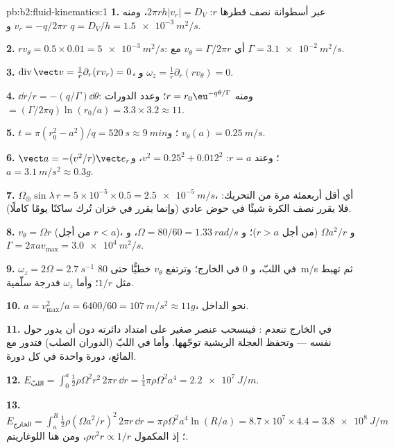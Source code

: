 \begin{solution}{pb:b2:fluid-kinematics:1}
\textbf{1.} عبر أسطوانة نصف قطرها $r$: $2\pi rh|v_r| = D_V$، ومنه
$v_r = -q/2\pi r$ و $q = D_V/h = \qty{1.5e-3}{m^2/s}$.

\textbf{2.} $rv_\theta = 0.5 \times 0.01 = \qty{5e-3}{m^2/s}$: أي $v_\theta = \Gamma/2\pi r$
مع $\Gamma = \qty{3.1e-2}{m^2/s}$.

\textbf{3.} $\operatorname{div}\vect v = \frac1r\partial_r(rv_r) = 0$، و $\omega_z =
\frac1r\partial_r(rv_\theta) = 0$.

\textbf{4.} $\dd r/r = -(q/\Gamma)\dd\theta$: ومنه $r = r_0\eu^{-q\theta/\Gamma}$؛ وعدد الدورات
$= (\Gamma/2\pi q)\ln(r_0/a) = 3.3 \times 3.2 \approx 11$.

\textbf{5.} $t = \pi(r_0^2 - a^2)/q = \qty{520}{s} \approx \qty{9}{min}$؛ و $v_\theta(a) =
\qty{0.25}{m/s}$.

\textbf{6.} $\vect a = -(v^2/r)\vect e_r$؛ وعند $r = a$: $v^2 = 0.25^2 + 0.012^2$،
و $a = \qty{3.1}{m/s^2} \approx 0.3g$.

\textbf{7.} $\Omega_\oplus\sin\lambda\,r = 5 \times 10^{-5} \times 0.5 = \qty{2.5e-5}{m/s}$،
أي أقل أربعمئة مرة من التحريك: فلا يقرر نصف الكرة شيئًا في حوض
عادي (وإنما يقرر في خزان تُرك ساكنًا يومًا كاملًا).

\textbf{8.} $v_\theta = \Omega r$ (من أجل $r < a$)، و $\Omega a^2/r$ (من أجل $r > a$)؛ و $\Omega = 80/60
= \qty{1.33}{rad/s}$، و $\Gamma = 2\pi av_{\max} = \qty{3.0e4}{m^2/s}$.

\textbf{9.} $\omega_z = 2\Omega = \qty{2.7}{s^{-1}}$ في اللبّ، و $0$ في الخارج؛
وترتفع $v_\theta$ خطيًّا حتى \qty{80}{m/s} ثم تهبط مثل $1/r$؛ وأما $\omega_z$ فدرجة
سلّمية.

\textbf{10.} $a = v_{\max}^2/a = 6400/60 = \qty{107}{m/s^2} \approx 11g$، نحو الداخل.

\textbf{11.} في الخارج تنعدم : فينسحب عنصر صغير على
امتداد دائرته دون أن يدور حول نفسه --- وتحفظ العجلة الريشية
توجّهها. وأما في اللبّ (الدوران الصلب) فتدور مع المائع، دورة
واحدة في كل دورة.

\textbf{12.} $E_{\text{اللبّ}} = \int_0^a\tfrac12\rho\Omega^2r^2\,2\pi r\,\dd r =
\tfrac14\pi\rho\Omega^2a^4 = \qty{2.2e7}{J/m}$.

\textbf{13.} $E_{\text{الخارج}} = \int_a^R\tfrac12\rho(\Omega a^2/r)^2\,2\pi r\,\dd r =
\pi\rho\Omega^2a^4\ln(R/a) = 8.7 \times 10^7 \times 4.4 = \qty{3.8e8}{J/m}$؛ إذ
المكمول $\rho v^2r \propto 1/r$، ومن هنا اللوغاريتم.


\end{solution}
